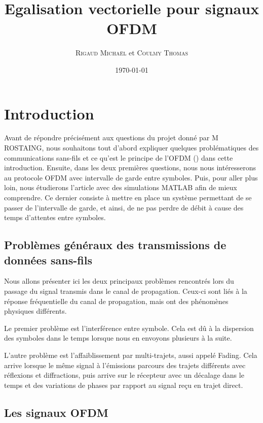 \documentclass[a4paper, 11pt, oneside, oldfontcommands]{memoir}
\title{Egalisation vectorielle pour signaux OFDM}
\author{\textsc{Rigaud Michaël} et \textsc{Coulmy Thomas}}
\date{\today}
\newcounter{rem}[chapter]
\newcounter{th}[chapter]
\begin{document}
\maketitle
\thispagestyle{empty}
\newpage

\tableofcontents



\chapter*{Introduction}
Avant de répondre précisément aux questions du projet donné par M ROSTAING, nous
souhaitons tout d’abord expliquer quelques problématiques des communications
sans-fils et ce qu’est le principe de l’OFDM () dans cette introduction.
Ensuite, dans les deux premières questions, nous nous intéresserons au protocole
OFDM avec intervalle de garde entre symboles. Puis, pour aller plus loin, nous
étudierons l’article\cite{sujet} avec des simulations MATLAB afin de mieux comprendre.
Ce dernier consiste à mettre en place un système permettant de se passer de
l’intervalle de garde, et ainsi, de ne pas perdre de débit à cause des temps
d’attentes entre symboles.
\section*{Problèmes généraux des transmissions de données sans-fils}
Nous allons présenter ici les deux principaux problèmes rencontrés lors du
passage du signal transmis dans le canal de propagation. Ceux-ci sont liés à la
réponse fréquentielle du canal de propagation, mais ont des phénomènes physiques
différents.

Le premier problème est l’interférence entre symbole. Cela est dû à la
dispersion des symboles dans le temps lorsque nous en envoyons plusieurs à la suite.

L’autre problème est l’affaiblissement par multi-trajets, aussi appelé Fading.
Cela arrive lorsque le même signal à l’émissions parcours des trajets différents
avec réflexions et diffractions, puis arrive sur le récepteur avec un décalage
dans le temps et des variations de phases par rapport au signal reçu en trajet direct.

\section*{Les signaux OFDM}
\end{document}
